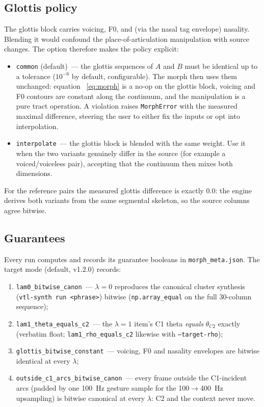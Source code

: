 \documentclass[11pt,a4paper]{article}
\newcommand{\lam}{\lambda}
\newcommand{\code}[1]{\texttt{#1}}
\begin{document}
\subsection{Glottis policy}\label{sec:glottis}

The glottis block carries voicing, F0, and (via the nasal tag
envelope) nasality.  Blending it would confound the place-of-articulation
manipulation with source changes.  The option therefore makes the
policy explicit:

\begin{itemize}[leftmargin=1.6em]
\item \code{common} (default)~--- the glottis sequences of $A$ and
$B$ must be identical up to a tolerance ($10^{-6}$ by default,
configurable).  The morph then uses them unchanged: equation%
~\eqref{eq:morph} is a no-op on the glottis block, voicing and F0
contours are constant along the continuum, and the manipulation is
a pure tract operation.  A violation raises \code{MorphError} with
the measured maximal difference, steering the user to either fix
the inputs or opt into interpolation.
\item \code{interpolate}~--- the glottis block is blended with the
same weight.  Use it when the two variants genuinely differ in the
source (for example a voiced/voiceless pair), accepting that the
continuum then mixes both dimensions.
\end{itemize}

For the reference pairs the measured glottis difference is exactly
$0.0$: the engine derives both variants from the same segmental
skeleton, so the source columns agree bitwise.

\subsection{Guarantees}\label{sec:guarantees}

Every run computes and records its guarantee booleans in
\code{morph\_meta.json}.  The target mode (default, v1.2.0) records:

\begin{enumerate}[leftmargin=1.6em]
\item \code{lam0\_bitwise\_canon}~--- $\lam = 0$ reproduces the
canonical cluster synthesis (\code{vtl-synth run <phrase>})
bitwise (\code{np.array\_equal} on the full 30-column sequence);
\item \code{lam1\_theta\_equals\_c2}~--- the $\lam = 1$ item's C1
theta \emph{equals} $\theta_{C2}$ exactly (verbatim float;
\code{lam1\_rho\_equals\_c2} likewise with \code{--target-rho});
\item \code{glottis\_bitwise\_constant}~--- voicing, F0 and
nasality envelopes are bitwise identical at every $\lam$;
\item \code{outside\_c1\_arcs\_bitwise\_canon}~--- every frame
outside the C1-incident arcs (padded by one 100~Hz gesture sample
for the 100$\to$400~Hz upsampling) is bitwise canonical at every
$\lam$: C2 and the context never move.
\end{enumerate}
\end{document}
